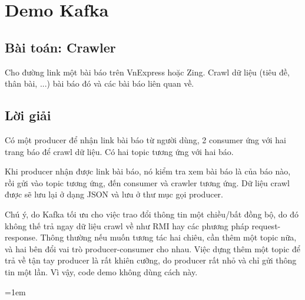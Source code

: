 \documentclass{article}
\begin{document}
\section{Demo Kafka}

\subsection{Bài toán: Crawler}

Cho đường link một bài báo trên VnExpress hoặc Zing. Crawl dữ liệu (tiêu đề,
thân bài, ...) bài báo đó và các bài báo liên quan về.

\subsection{Lời giải}

Có một producer để nhận link bài báo từ người dùng, 2 consumer ứng với hai trang
báo để crawl dữ liệu. Có hai topic tương ứng với hai báo.

Khi producer nhận được link bài báo, nó kiểm tra xem bài báo là của báo nào, rồi
gửi vào topic tương ứng, đến consumer và crawler tương ứng. Dữ liệu crawl được
sẽ lưu lại ở dạng JSON và lưu ở thư mục gọi producer.

Chú ý, do Kafka tối ưu cho việc trao đổi thông tin một chiều/bất đồng bộ, do đó
không thế trả ngay dữ liệu crawl về như RMI hay các phương pháp
request-response. Thông thường nếu muốn tương tác hai chiêu, cần thêm một topic
nữa, và hai bên đổi vai trò producer-consumer cho nhau. Việc dựng thêm một topic
để trả về tận tay producer là rất khiên cưỡng, do producer rất nhỏ và chỉ gửi
thông tin một lần. Vì vậy, code demo không dùng cách này.

\emergencystretch=1em
\printbibliography[title={Tài liệu tham khảo}]
\end{document}

